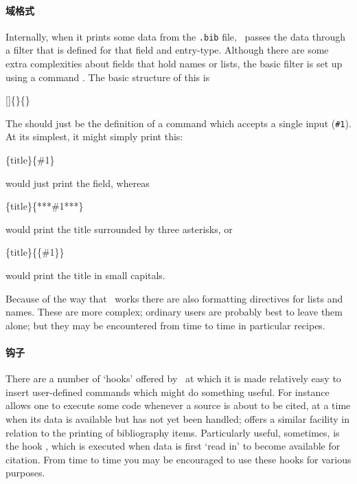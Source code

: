 \paragraph{域格式} Internally, when it prints some data from
the \verb|.bib| file, \biblatex\ passes the data through a filter that
is defined for that field and entry-type. Although there are some
extra complexities about fields that hold names or lists, the basic
filter is set up using a command . The basic
structure of this is
\begin{pseudoverb}
[]\{\}\{\}
\end{pseudoverb}
The  should just be the definition of a command which
accepts a single input (\texttt{\#1}). At its simplest, it
might simply print this:
\begin{pseudoverb}
\{title\}\{\#1\}
\end{pseudoverb}
would just print the field, whereas
\begin{pseudoverb}
\{title\}\{***\#1***\}
\end{pseudoverb}
would print the title surrounded by three asterisks, or
\begin{pseudoverb}
\{title\}\{\{\#1\}\}
\end{pseudoverb}
would print the title in small capitals.

Because of the way that \biblatex\ works there are also formatting
directives for lists and
names.
These are more complex; ordinary users are probably best to leave them
alone; but they may be encountered from time to time in particular recipes.

\paragraph{钩子} There are a number
of `hooks' offered by \biblatex\ at which it is made relatively easy
to insert user-defined commands which might do something useful. For
instance  allows one to
execute some code whenever a source is about to be cited, at a time
when its data is available but has not yet been handled;
 offers a similar facility
in relation to the printing of bibliography items. Particularly
useful, sometimes, is the hook ,
which is executed when data is first `read in' to become available for
citation. From time to time you may be encouraged to use these hooks
for various purposes.

